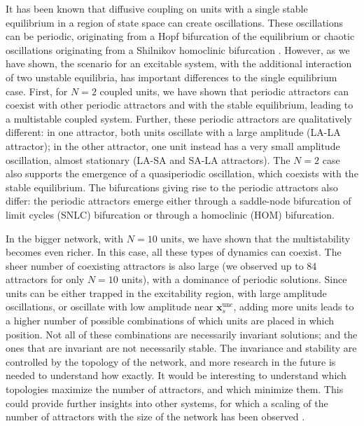 It has been known that diffusive coupling on units with a single stable equilibrium in a region of state space can create oscillations. These oscillations can be periodic, originating from a Hopf bifurcation of the equilibrium \cite{smale1976a, pogromsky1999on} or chaotic oscillations \cite{kocarev1995on} originating from a Shilnikov homoclinic bifurcation \cite{nijholt2023chaotic}. However, as we have shown, the scenario for an excitable system, with the additional interaction of two unstable equilibria, has important differences to the single equilibrium case. First, for $N=2$ coupled units, we have shown that periodic attractors can coexist with other periodic attractors and with the stable equilibrium, leading to a multistable coupled system. Further, these periodic attractors are qualitatively different: in one attractor, both units oscillate with a large amplitude (LA-LA attractor); in the other attractor, one unit instead has a very small amplitude oscillation, almost stationary (LA-SA and SA-LA attractors). The $N=2$ case also supports the emergence of a quasiperiodic oscillation, which coexists with the stable equilibrium. The bifurcations giving rise to the periodic attractors also differ: the periodic attractors emerge either through a saddle-node bifurcation of limit cycles (SNLC) bifurcation or through a homoclinic (HOM) bifurcation.

In the bigger network, with $N=10$ units, we have shown that the multistability becomes even richer. In this case, all these types of dynamics can coexist. The sheer number of coexisting attractors is also large (we observed up to 84 attractors for only $N=10$ units), with a dominance of periodic solutions. Since units can be either trapped in the excitability region, with large amplitude oscillations, or oscillate with low amplitude near $\mathbf{x}_s^\mathrm{unc}$, adding more units leads to a higher number of possible combinations of which units are placed in which position. Not all of these combinations are necessarily invariant solutions; and the ones that are invariant are not necessarily stable. The invariance and stability are controlled by the topology of the network, and more research in the future is needed to understand how exactly. It would be interesting to understand which topologies maximize the number of attractors, and which minimize them. This could provide further insights into other systems, for which a scaling of the number of attractors with the size of the network has been observed \cite{ullner2007multistability, rossi2022shifts, gelbrecht2020monte}.

